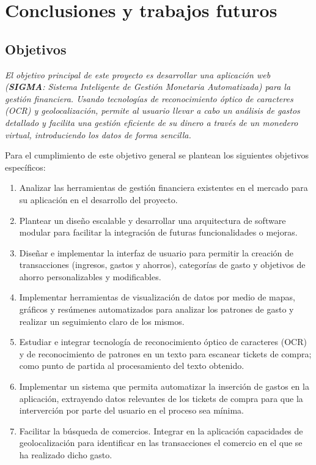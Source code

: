 \chapter{Conclusiones y trabajos futuros}

\section{Objetivos} \label{sect:goals}
\textit{El objetivo principal de este proyecto es desarrollar una aplicación web (\textbf{SIGMA}: Sistema Inteligente de Gestión Monetaria Automatizada) 
para la gestión financiera. Usando tecnologías de reconocimiento
óptico de caracteres (OCR) y geolocalización, permite al usuario llevar a cabo un 
análisis de gastos detallado y facilita una gestión eficiente de su dinero
a través de un monedero virtual, introduciendo los datos de 
forma sencilla.}

Para el cumplimiento de este objetivo general se plantean los siguientes objetivos específicos:
\begin{enumerate}
    \item Analizar las herramientas de gestión financiera existentes en el mercado para su aplicación en el desarrollo del proyecto.  
    \item Plantear un diseño escalable y desarrollar una arquitectura de software modular para facilitar la integración de futuras funcionalidades o mejoras. 
    \item Diseñar e implementar la interfaz de usuario para permitir la creación 
         de transacciones (ingresos, gastos y ahorros), categorías de gasto y objetivos de ahorro personalizables y modificables.
    \item Implementar herramientas de visualización de datos por medio de mapas, gráficos y resúmenes automatizados para analizar los patrones de gasto y realizar un seguimiento claro de los mismos.
    \item Estudiar e integrar tecnología de reconocimiento óptico de caracteres (OCR) y de reconocimiento de patrones en un texto para escanear tickets de compra; como punto de partida al procesamiento del texto obtenido.
    \item Implementar un sistema que permita automatizar la inserción de gastos en la aplicación, extrayendo datos relevantes de los tickets de compra para que la interverción por parte del usuario en el proceso sea mínima.
    \item Facilitar la búsqueda de comercios. Integrar en la aplicación capacidades de geolocalización para identificar en las transacciones el comercio en el que se ha realizado dicho gasto.   
    
\end{enumerate}

